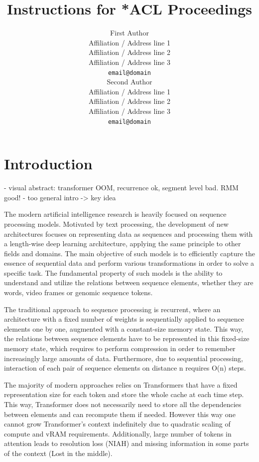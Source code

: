 \documentclass[11pt]{article}
\title{Instructions for *ACL Proceedings}
\author{First Author \\
  Affiliation / Address line 1 \\
  Affiliation / Address line 2 \\
  Affiliation / Address line 3 \\
  \texttt{email@domain} \\\And
  Second Author \\
  Affiliation / Address line 1 \\
  Affiliation / Address line 2 \\
  Affiliation / Address line 3 \\
  \texttt{email@domain} \\}
\begin{document}
\maketitle
\begin{abstract}

\end{abstract}

\section{Introduction}

- visual abstract: transformer OOM, recurrence ok, segment level bad. RMM good!
- too general intro -> key idea

The modern artificial intelligence research is heavily focused on sequence processing models. Motivated by text processing, the development of new architectures focuses on representing data as sequences and processing them with a length-wise deep learning architecture, applying the same principle to other fields and domains. The main objective of such models is to efficiently capture the essence of sequential data and perform various transformations in order to solve a specific task. The fundamental property of such models is the ability to understand and utilize the relations between sequence elements, whether they are words, video frames or genomic sequence tokens. 

The traditional approach to sequence processing is recurrent, where an architecture with a fixed number of weights is sequentially applied to sequence elements one by one, augmented with a constant-size memory state. This way, the relations between sequence elements have to be represented in this fixed-size memory state, which requires to perform compression in order to remember increasingly large amounts of data. Furthermore, due to sequential processing, interaction of each pair of sequence elements on distance n requires O(n) steps.

The majority of modern approaches relies on Transformers that have a fixed representation size for each token and store the whole cache at each time step. This way, Transformer does not necessarily need to store all the dependencies between elements and can recompute them if needed. However this way one cannot grow Transformer's context indefinitely due to quadratic scaling of compute and vRAM requirements. Additionally, large number of tokens in attention leads to resolution loss (NIAH) and missing information in some parts of the context (Lost in the middle). 
\end{document}
